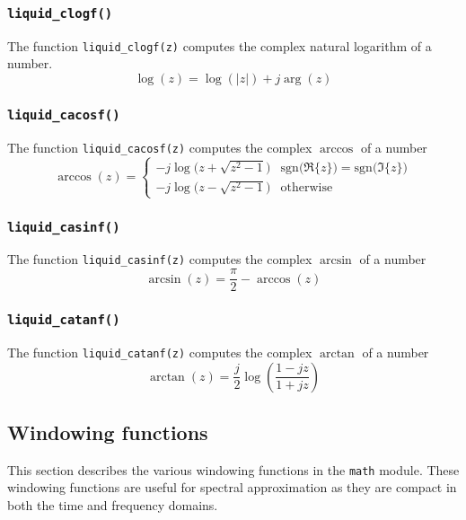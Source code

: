 \subsubsection{{\tt liquid\_clogf()}}
\label{module:math:complex:clogf}
The function {\tt liquid\_clogf(z)}
computes the complex natural logarithm of a number.
%
\begin{equation}
\label{eqn:math:clogf}
    \log(z) =   \log(|z|) + j\arg(z)
\end{equation}
%


\subsubsection{{\tt liquid\_cacosf()}}
\label{module:math:complex:cacosf}
The function {\tt liquid\_cacosf(z)}
computes the complex $\arccos$ of a number
%
\begin{equation}
\label{eqn:math:cacosf}
    \arccos(z) =
        \begin{cases}
        -j \log\bigl( z + \sqrt{z^2 - 1} \bigr) &
            \text{sgn}\bigl(\Re\{z\}\bigr) =
            \text{sgn}\bigl(\Im\{z\}\bigr) \\
        -j \log\bigl( z - \sqrt{z^2 - 1} \bigr) & \text{otherwise}
        \end{cases}
\end{equation}
%


\subsubsection{{\tt liquid\_casinf()}}
\label{module:math:complex:casinf}
The function {\tt liquid\_casinf(z)}
computes the complex $\arcsin$ of a number
%
\begin{equation}
\label{eqn:math:casinf}
    \arcsin(z) = \frac{\pi}{2} - \arccos(z)
\end{equation}
%



\subsubsection{{\tt liquid\_catanf()}}
\label{module:math:complex:catanf}
The function {\tt liquid\_catanf(z)}
computes the complex $\arctan$ of a number
%
\begin{equation}
\label{eqn:math:catanf}
    \arctan(z) =
        \frac{j}{2}
        \log\left( \frac{1-jz}{1+jz} \right)
\end{equation}
%


% 
%
\subsection{Windowing functions}
\label{module:math:window}
This section describes the various windowing functions in the {\tt math}
module.
These windowing functions are useful for spectral approximation as they
are compact in both the time and frequency domains.

